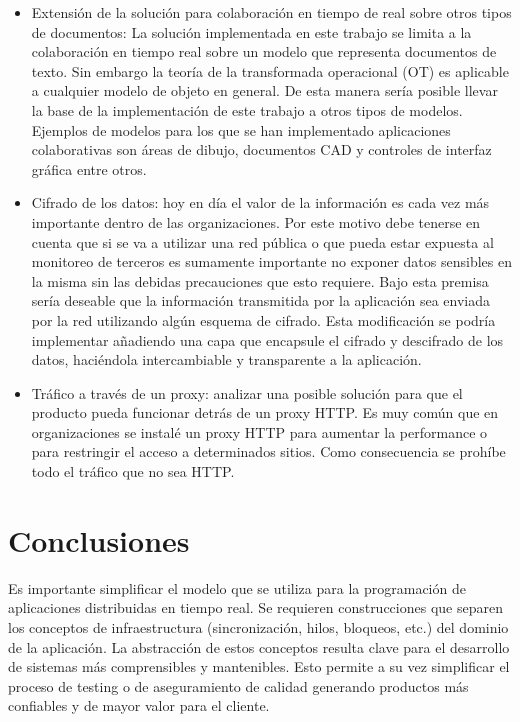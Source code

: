 \documentclass[12pt,a4paper]{article}
\let\stdsection\section
\renewcommand\section{\newpage\stdsection}
\begin{document}
\begin{itemize}
	\item Extensión de la solución para colaboración en tiempo de real sobre otros tipos de documentos:
		La solución implementada en este trabajo se limita a la colaboración en tiempo real sobre un modelo que representa
		documentos de texto. Sin embargo la teoría de la transformada operacional (OT) es aplicable a cualquier modelo de objeto en
		general. De esta manera sería posible llevar la base de la implementación de este trabajo a otros tipos de modelos. Ejemplos
		de modelos para los que se han implementado aplicaciones colaborativas son áreas de dibujo, documentos CAD y controles de
		interfaz gráfica entre otros.

	\item Cifrado de los datos: hoy en día el valor de la información es cada vez más importante dentro de las organizaciones. 
		Por este motivo debe tenerse en cuenta que si se va a utilizar una red pública o que pueda estar expuesta al monitoreo
		de terceros es sumamente importante no exponer datos sensibles en la misma sin las debidas precauciones que esto requiere.
		Bajo esta premisa sería deseable que la información transmitida por la aplicación sea enviada por la red utilizando algún
		esquema de cifrado. Esta modificación se podría implementar añadiendo una capa que encapsule el cifrado y descifrado de
		los datos, haciéndola intercambiable y transparente a la aplicación.

	\item Tráfico a través de un proxy: analizar una posible solución para que el producto pueda funcionar detrás de un
		proxy HTTP. Es muy común que en organizaciones se instalé un proxy HTTP para aumentar la performance o para
		restringir el acceso a determinados sitios. Como consecuencia se prohíbe todo el tráfico que no sea HTTP.
		
\end{itemize}

\section{Conclusiones}

Es importante simplificar el modelo que se utiliza para la programación de aplicaciones distribuidas
en tiempo real. Se requieren construcciones que separen los conceptos de infraestructura (sincronización, hilos, bloqueos, etc.)
del dominio de la aplicación. La abstracción de estos conceptos resulta clave para el desarrollo de sistemas
más comprensibles y mantenibles. Esto permite a su vez simplificar el proceso de testing o de aseguramiento
de calidad generando productos más confiables y de mayor valor para el cliente.
\end{document}
